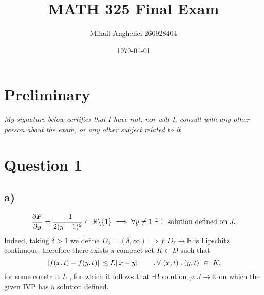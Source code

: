 \documentclass[
	12pt,
	]{article}
\title{MATH 325 Final Exam}
\author{Mihail Anghelici 260928404 }
\date{\today}
\newcommand{\R}{\mathbb{R}}
\DeclarePairedDelimiter{\norm}{\lVert}{\rVert}
\theoremstyle{definition}
\theoremstyle{definition}
\theoremstyle{definition}
\theoremstyle{definition}
\theoremstyle{definition}
\theoremstyle{example}
\theoremstyle{note}
\theoremstyle{remark}
\theoremstyle{example}
\begin{document}
	\maketitle
		\section*{Preliminary }
			\textit{My signature below certifies that I have not, nor will
			I, consult with any other person about the exam, or any other subject
			related to it}
		\section*{Question 1 }
			\subsection*{a) }
				$$ \pdv{F}{y} = \frac{-1}{2(y-1)^{2}} \subset \R \backslash \{1\} \implies \forall y\neq 1 \ \exists \ ! \ \text{ solution defined on} \ J.$$
				Indeed, taking $\delta >1$ we define $D_{\delta}= (\delta, \infty) \implies f: D_{\delta} \to \R $ is Lipschitz continuous, therefore there exists a compact set $K \subset D$ such that 
				$$ \norm{f(x,t) - f(y,t)} \le L\norm{x-y}\qquad, \forall \ (x,t) \ , (y,t) \ \in \ K,$$
				for some constant $L$ , for which it follows that $\exists \ !$ solution $\varphi : J \to \R$ on which the given IVP has a solution defined. 
				
\end{document}
